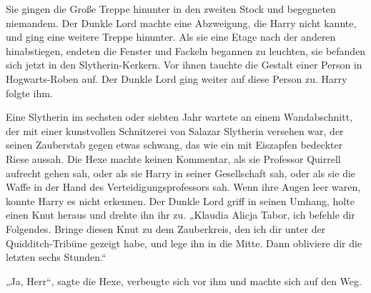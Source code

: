Sie gingen die Große Treppe hinunter in den zweiten Stock und begegneten niemandem.
Der Dunkle Lord machte eine Abzweigung, die Harry nicht kannte, und ging eine weitere Treppe hinunter. Als sie eine Etage nach der anderen hinabstiegen, endeten die Fenster und Fackeln begannen zu leuchten, sie befanden sich jetzt in den Slytherin-Kerkern.
Vor ihnen tauchte die Gestalt einer Person in Hogwarts-Roben auf.
Der Dunkle Lord ging weiter auf diese Person zu.
Harry folgte ihm.

Eine Slytherin im sechsten oder siebten Jahr wartete an einem Wandabschnitt, der mit einer kunstvollen Schnitzerei von Salazar Slytherin versehen war, der seinen Zauberstab gegen etwas schwang, das wie ein mit Eiszapfen bedeckter Riese aussah. Die Hexe machte keinen Kommentar, als sie Professor Quirrell aufrecht gehen sah, oder als sie Harry in seiner Gesellschaft sah, oder als sie die Waffe in der Hand des Verteidigungsprofessors sah. Wenn ihre Augen leer waren, konnte Harry es nicht erkennen.
Der Dunkle Lord griff in seinen Umhang, holte einen Knut heraus und drehte ihn ihr zu.
„Klaudia Alicja Tabor, ich befehle dir Folgendes. Bringe diesen Knut zu dem Zauberkreis, den ich dir unter der Quidditch-Tribüne gezeigt habe, und lege ihn in die Mitte. Dann obliviere dir die letzten sechs Stunden.“

„Ja, Herr“, sagte die Hexe, verbeugte sich vor ihm und machte sich auf den Weg.

